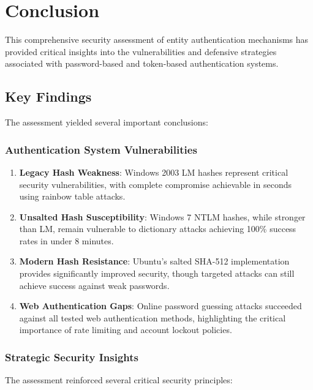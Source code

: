 \section{Conclusion}

This comprehensive security assessment of entity authentication mechanisms has provided critical insights into the vulnerabilities and defensive strategies associated with password-based and token-based authentication systems.

\subsection{Key Findings}

The assessment yielded several important conclusions:

\subsubsection{Authentication System Vulnerabilities}

\begin{enumerate}
    \item \textbf{Legacy Hash Weakness}: Windows 2003 LM hashes represent critical security vulnerabilities, with complete compromise achievable in seconds using rainbow table attacks.

    \item \textbf{Unsalted Hash Susceptibility}: Windows 7 NTLM hashes, while stronger than LM, remain vulnerable to dictionary attacks achieving 100\% success rates in under 8 minutes.

    \item \textbf{Modern Hash Resistance}: Ubuntu's salted SHA-512 implementation provides significantly improved security, though targeted attacks can still achieve success against weak passwords.

    \item \textbf{Web Authentication Gaps}: Online password guessing attacks succeeded against all tested web authentication methods, highlighting the critical importance of rate limiting and account lockout policies.
\end{enumerate}

\subsubsection{Strategic Security Insights}

The assessment reinforced several critical security principles:

